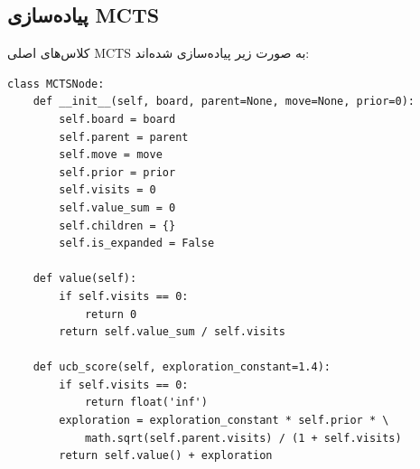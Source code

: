 \documentclass[12pt,a4paper]{article}
\begin{document}
	\subsection{پیاده‌سازی MCTS}
	کلاس‌های اصلی MCTS به صورت زیر پیاده‌سازی شده‌اند:
	\\
	\begin{latin}
\begin{verbatim}
class MCTSNode:
    def __init__(self, board, parent=None, move=None, prior=0):
        self.board = board
        self.parent = parent
        self.move = move
        self.prior = prior
        self.visits = 0
        self.value_sum = 0
        self.children = {}
        self.is_expanded = False

    def value(self):
        if self.visits == 0:
            return 0
        return self.value_sum / self.visits

    def ucb_score(self, exploration_constant=1.4):
        if self.visits == 0:
            return float('inf')
        exploration = exploration_constant * self.prior * \
            math.sqrt(self.parent.visits) / (1 + self.visits)
        return self.value() + exploration
\end{verbatim}
\end{latin}
	
\end{document}
